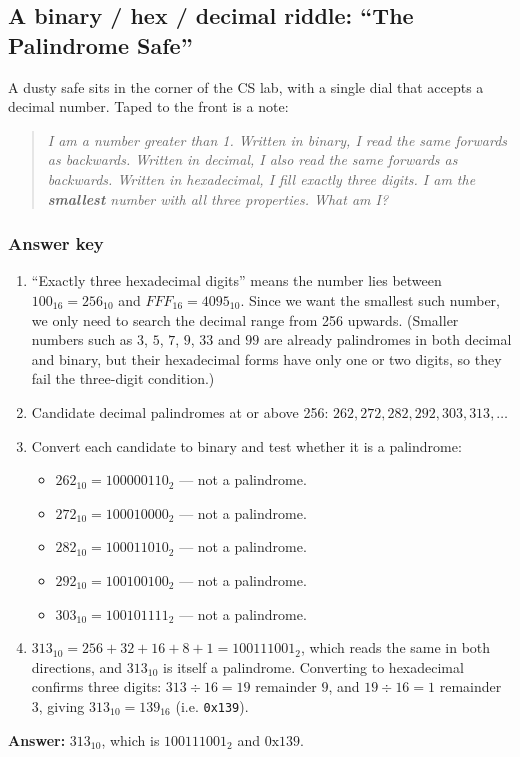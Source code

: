 \documentclass[a4paper,12pt]{article}
\begin{document}
\subsection{A binary / hex / decimal riddle: ``The Palindrome Safe''}
A dusty safe sits in the corner of the CS lab, with a single dial that accepts a decimal number. Taped to the front is a note:
\begin{quote}
\itshape
I am a number greater than 1. Written in binary, I read the same forwards as backwards. Written in decimal, I also read the same forwards as backwards. Written in hexadecimal, I fill exactly three digits. I am the \textbf{smallest} number with all three properties. What am I?
\end{quote}
\subsubsection{Answer key}
\begin{enumerate}
    \item ``Exactly three hexadecimal digits'' means the number lies between $100_{16}=256_{10}$ and $FFF_{16}=4095_{10}$. Since we want the smallest such number, we only need to search the decimal range from 256 upwards. (Smaller numbers such as $3$, $5$, $7$, $9$, $33$ and $99$ are already palindromes in both decimal and binary, but their hexadecimal forms have only one or two digits, so they fail the three-digit condition.)
    \item Candidate decimal palindromes at or above 256: $262, 272, 282, 292, 303, 313, \dots$
    \item Convert each candidate to binary and test whether it is a palindrome:
    \begin{itemize}
        \item $262_{10}=100000110_2$ --- not a palindrome.
        \item $272_{10}=100010000_2$ --- not a palindrome.
        \item $282_{10}=100011010_2$ --- not a palindrome.
        \item $292_{10}=100100100_2$ --- not a palindrome.
        \item $303_{10}=100101111_2$ --- not a palindrome.
    \end{itemize}
    \item $313_{10}=256+32+16+8+1=100111001_2$, which reads the same in both directions, and $313_{10}$ is itself a palindrome. Converting to hexadecimal confirms three digits: $313 \div 16 = 19$ remainder $9$, and $19 \div 16 = 1$ remainder $3$, giving $313_{10}=139_{16}$ (i.e. \texttt{0x139}).
\end{enumerate}
\textbf{Answer:} $313_{10}$, which is $100111001_2$ and $\text{0x}139$.
\end{document}
